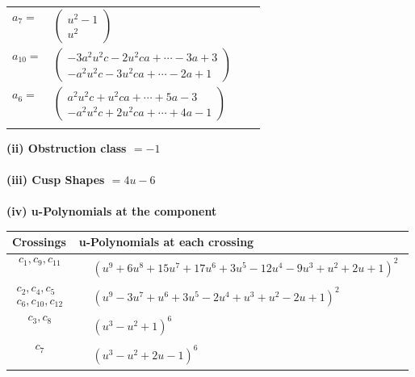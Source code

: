 \documentclass[1p]{elsarticle_modified}
\theoremstyle{definition}
\begin{document}
\begin{tabular}{m{7pt} m{180pt} m{7pt} m{180pt} }
\flushright $a_{7}=$&$\begin{pmatrix}u^2-1\\u^2\end{pmatrix}$ \\
\flushright $a_{10}=$&$\begin{pmatrix}-3 a^2 u^2 c-2 u^2 c a+\cdots-3 a+3\\- a^2 u^2 c-3 u^2 c a+\cdots-2 a+1\end{pmatrix}$ \\
\flushright $a_{6}=$&$\begin{pmatrix}a^2 u^2 c+u^2 c a+\cdots+5 a-3\\- a^2 u^2 c+2 u^2 c a+\cdots+4 a-1\end{pmatrix}$\\&\end{tabular}
\flushleft \textbf{(ii) Obstruction class $= -1$}\\~\\
\flushleft \textbf{(iii) Cusp Shapes $= 4 u-6$}\\~\\
\newpage\renewcommand{\arraystretch}{1}
\flushleft \textbf{(iv) u-Polynomials at the component}\newline \\
\begin{tabular}{m{50pt}|m{274pt}}
Crossings & \hspace{64pt}u-Polynomials at each crossing \\
\hline $$\begin{aligned}c_{1},c_{9},c_{11}\end{aligned}$$&$\begin{aligned}
&(u^9+6 u^8+15 u^7+17 u^6+3 u^5-12 u^4-9 u^3+u^2+2 u+1)^2
\end{aligned}$\\
\hline $$\begin{aligned}c_{2},c_{4},c_{5}\\c_{6},c_{10},c_{12}\end{aligned}$$&$\begin{aligned}
&(u^9-3 u^7+u^6+3 u^5-2 u^4+u^3+u^2-2 u+1)^2
\end{aligned}$\\
\hline $$\begin{aligned}c_{3},c_{8}\end{aligned}$$&$\begin{aligned}
&(u^3- u^2+1)^6
\end{aligned}$\\
\hline $$\begin{aligned}c_{7}\end{aligned}$$&$\begin{aligned}
&(u^3- u^2+2 u-1)^6
\end{aligned}$\\
\hline
\end{tabular}\\~\\
\end{document}
